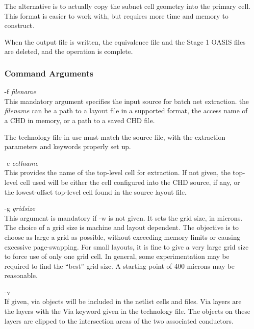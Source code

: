 The alternative is to actually copy the subnet cell geometry into the
primary cell.  This format is easier to work with, but requires more
time and memory to construct.

When the output file is written, the equivalence file and the Stage 1
OASIS files are deleted, and the operation is complete.

\subsubsection{Command Arguments}

\begin{description}
\item{\vt -f} {\it filename}\\
This mandatory argument specifies the input source for batch net
extraction.  the {\it filename} can be a path to a layout file in a
supported format, the access name of a CHD in memory, or a path to a
saved CHD file.

The technology file in use must match the source file, with the
extraction parameters and keywords properly set up.

\item{\vt -c} {\it cellname}\\
This provides the name of the top-level cell for extraction.  If not
given, the top-level cell used will be either the cell configured into
the CHD source, if any, or the lowest-offset top-level cell found in
the source layout file.

\item{\vt -g} {\it gridsize}\\
This argument is mandatory if {\vt -w} is not given.  It sets the grid
size, in microns.  The choice of a grid size is machine and layout
dependent.  The objective is to choose as large a grid as possible,
without exceeding memory limits or causing excessive page-swapping. 
For small layouts, it is fine to give a very large grid size to force
use of only one grid cell.  In general, some experimentation may be
required to find the ``best'' grid size.  A starting point of 400
microns may be reasonable.

\item{\vt -v}\\
If given, via objects will be included in the netlist cells and files. 
Via layers are the layers with the {\et Via} keyword given in the
technology file.  The objects on these layers are clipped to the
intersection areas of the two associated conductors.


\end{description}
